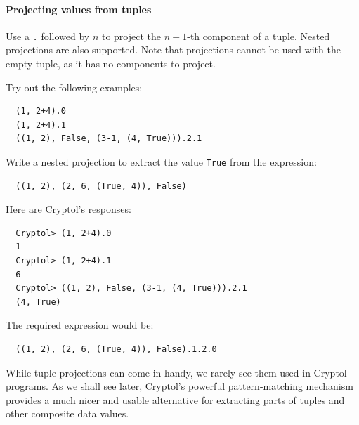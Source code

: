 
\paragraph*{Projecting values from tuples} Use a \texttt{.} followed by
$n$ to project the $n+1$-th component of a tuple. Nested projections
are also supported. Note that projections cannot be used with the
empty tuple, as it has no components to project.

\begin{Exercise}\label{ex:tup:2}
Try out the following examples:
\begin{Verbatim}
  (1, 2+4).0
  (1, 2+4).1
  ((1, 2), False, (3-1, (4, True))).2.1
\end{Verbatim}
Write a nested projection to extract the value \texttt{True} from the
expression:
\begin{Verbatim}
  ((1, 2), (2, 6, (True, 4)), False)
\end{Verbatim}
\end{Exercise}
\begin{Answer}
Here are Cryptol's responses:
\begin{Verbatim}
  Cryptol> (1, 2+4).0
  1
  Cryptol> (1, 2+4).1
  6
  Cryptol> ((1, 2), False, (3-1, (4, True))).2.1
  (4, True)
\end{Verbatim}
The required expression would be:
\begin{Verbatim}
  ((1, 2), (2, 6, (True, 4)), False).1.2.0
\end{Verbatim}
\end{Answer}

\begin{tip}
  While tuple projections can come in handy, we rarely see them used
  in Cryptol programs. As we shall see later, Cryptol's powerful
  pattern-matching mechanism provides a much nicer and usable
  alternative for extracting parts of tuples and other composite data
  values.
\end{tip}


